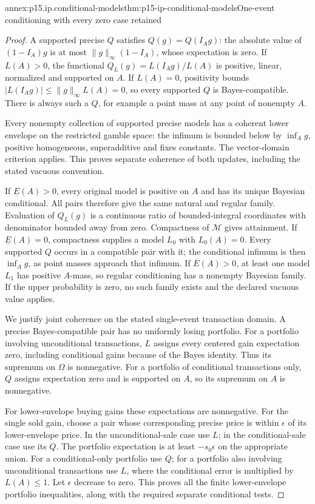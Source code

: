 \begin{annexitem}{annex:p15.ip.conditional-models}{thm:p15-ip-conditional-models}{One-event conditioning with every zero case retained}
\begin{proof}
A supported precise \(Q\) satisfies \(Q(g)=Q(I_Ag)\): the
absolute value of \((1-I_A)g\) is at most
\(\|g\|_\infty(1-I_A)\), whose expectation is zero.
If \(L(A)>0\), the functional
\(Q_L(g)=L(I_Ag)/L(A)\) is positive, linear, normalized and supported
on \(A\). If \(L(A)=0\), positivity bounds
\(|L(I_Ag)|\leq\|g\|_\infty L(A)=0\), so every supported \(Q\)
is Bayes-compatible. There is always such a \(Q\), for example a
point mass at any point of nonempty \(A\).

Every nonempty collection of supported precise models has a coherent
lower envelope on the restricted gamble space: the infimum is bounded
below by \(\inf_A g\), positive homogeneous, superadditive and fixes
constants. The vector-domain criterion applies. This proves separate
coherence of both updates, including the stated vacuous convention.

If \(\underline E(A)>0\), every original model is positive on \(A\)
and has its unique Bayesian conditional. All pairs therefore give the
same natural and regular family. Evaluation of \(Q_L(g)\) is a
continuous ratio of bounded-integral coordinates with denominator bounded
away from zero. Compactness of \(\mathcal M\) gives attainment.
If \(\underline E(A)=0\), compactness supplies a model \(L_0\)
with \(L_0(A)=0\). Every supported \(Q\) occurs in a compatible
pair with it; the conditional infimum is then \(\inf_A g\), as
point masses approach that infimum. If \(\overline E(A)>0\), at
least one model \(L_1\) has positive \(A\)-mass, so regular
conditioning has a nonempty Bayesian family. If the upper probability
is zero, no such family exists and the declared vacuous value applies.

We justify joint coherence on the stated single-event transaction
domain. A precise Bayes-compatible pair has no uniformly losing
portfolio. For a portfolio involving unconditional transactions,
\(L\) assigns every centered gain expectation zero, including
conditional gains because of the Bayes identity. Thus its supremum
on \(\Omega\) is nonnegative. For a portfolio of conditional
transactions only, \(Q\) assigns expectation zero and is supported
on \(A\), so its supremum on \(A\) is nonnegative.

For lower-envelope buying gains these expectations are nonnegative.
For the single sold gain, choose a pair whose corresponding precise
price is within \(\epsilon\) of its lower-envelope price. In the
unconditional-sale case use \(L\); in the conditional-sale case
use its \(Q\). The portfolio expectation is at least
\(-s_0\epsilon\) on the appropriate union. For a conditional-only
portfolio use \(Q\); for a portfolio also involving unconditional
transactions use \(L\), where the conditional error is multiplied
by \(L(A)\leq1\). Let \(\epsilon\) decrease to zero. This proves
all the finite lower-envelope portfolio inequalities, along with the
required separate conditional tests.


\end{proof}
\end{annexitem}
